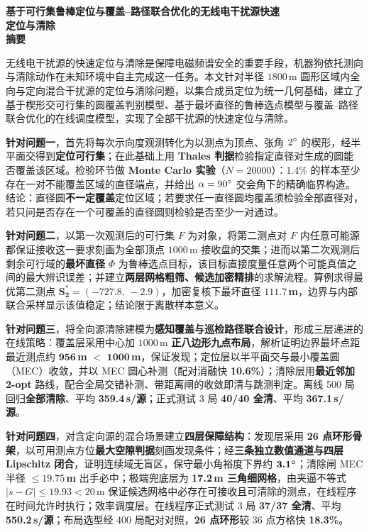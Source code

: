 \documentclass[12pt,a4paper]{ctexart}
\begin{document}
\pagestyle{plain}

\begin{center}
  {\bfseries 基于可行集鲁棒定位与覆盖--路径联合优化的无线电干扰源快速\\[2pt]
   定位与清除}\\[10pt]
  {\bfseries 摘\quad 要}
\end{center}
\vspace{6pt}

无线电干扰源的快速定位与清除是保障电磁频谱安全的重要手段，机器狗依托测向与清除动作在未知环境中自主完成这一任务。本文针对半径 $1800\,$m 圆形区域内全向与定向混合干扰源的定位与清除问题，以集合成员定位为统一几何基础，建立了基于楔形交可行集的圆覆盖判别模型、基于最坏直径的鲁棒选点模型与覆盖--路径联合优化的在线调度模型，实现了全部干扰源的快速定位与清除。

\textbf{针对问题一}，首先将每次示向度观测转化为以测点为顶点、张角 $2^{\circ}$ 的楔形，经半平面交得到\textbf{定位可行集}；在此基础上用 \textbf{Thales 判据}检验指定直径对生成的圆能否覆盖该区域。检验环节做 \textbf{Monte Carlo 实验}（$N=20000$）：1.4\% 的样本至少存在一对不能覆盖区域的直径端点，并给出 $\alpha=90^{\circ}$ 交会角下的精确临界构造。结论：直径圆\textbf{不一定覆盖}定位区域；若要求任一直径圆均覆盖须检验全部直径对，若只问是否存在一个可覆盖的直径圆则检验是否至少一对通过。

\textbf{针对问题二}，以第一次观测后的可行集 $F$ 为对象，将第二测点对 $F$ 内任意可能源都保证接收这一要求刻画为全部顶点 $1000\,$m 接收盘的交集；进而以第二次观测后剩余可行域的\textbf{最坏直径} $\Phi$ 为鲁棒选点目标，该目标直接度量任意两个可能真值之间的最大辨识误差；并建立\textbf{两层网格粗筛、候选加密精排}的求解流程。算例求得最优第二测点 $\bm{S_2^{*}=(-727.8,\,-2.9)}$，加密复核下最坏直径 $\bm{111.7\,}$\textbf{m}，边界与内部联合采样显示该值稳定；结论限于离散样本意义。

\textbf{针对问题三}，将全向源清除建模为\textbf{感知覆盖与巡检路径联合设计}，形成三层递进的在线策略：覆盖层采用中心加 $1000\,$m \textbf{正八边形九点布局}，解析证明边界最坏点距最近测点约 $\bm{956\,}$\textbf{m} $\bm{<}$ $\bm{1000\,}$\textbf{m}，保证发现；定位层以半平面交与最小覆盖圆（MEC）收敛，并以 MEC 圆心补测（配对消融快 \textbf{10.6\%}）；清除层用\textbf{最近邻加 2-opt} 路线，配合全局交错补测、带距离闸的收敛即清与跳测判定。离线 500 局回归\textbf{全部清除}、平均 \textbf{359.4\,s/源}；正式测试 3 局 \textbf{40/40 全清}、平均 \textbf{367.1\,s/源}。

\textbf{针对问题四}，对含定向源的混合场景建立\textbf{四层保障结构}：发现层采用 \textbf{26 点环形骨架}，以可用测点方位\textbf{最大空隙判据}刻画发现条件；经\textbf{三条独立数值通道与四层 Lipschitz 闭合}，证明连续域无盲区，保守最小角裕度下界约 $\bm{3.1^{\circ}}$；清除闸 MEC 半径 $\bm{\le 19.75\,}$\textbf{m} 出手必中；极端兜底层为 \textbf{17.2\,m 三角细网格}，由夹逼不等式 $|s-G|\le 19.93<20\,$m 保证候选网格中必存在可接收且可清除的测点，在线程序在时间允许时执行；效率调度层。在线程序正式测试 3 局 \textbf{37/37 全清}、平均 \textbf{550.2\,s/源}；布局选型经 400 局配对对照，\textbf{26 点环形}较 36 点方格快 \textbf{18.3\%}。
\end{document}
